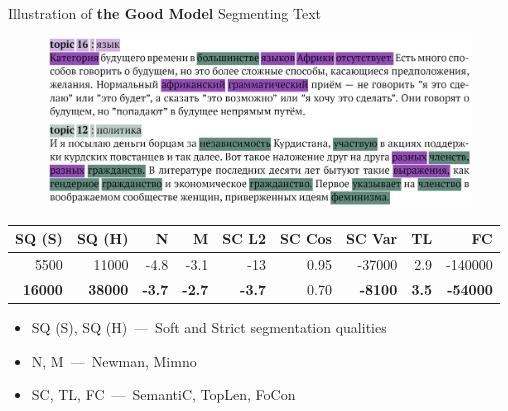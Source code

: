 \documentclass[russian]{beamer}
\begin{document}
\begin{frame}{Illustration of \textbf{the Good Model} Segmenting Text}
  \begin{figure}[h]
    \centering
    \includegraphics[width=\textwidth]{combine_good.jpg}
  \end{figure}
    
  \vspace{-0.5cm}

  \begin{table}[h]
    \scriptsize
    \centering
    \begin{tabular}{rrrrrrrrr}
      SQ (S) & SQ (H) & N & M & SC L2 & SC Cos & SC Var & TL & FC\\
      \midrule
      5500 & 11000 & -4.8 & -3.1 & -13 & 0.95 & -37000 & 2.9 & -140000\\
      \rowcolor{my-blue-light}
      \textbf{16000} & \textbf{38000} & \textbf{-3.7} & \textbf{-2.7} & \textbf{-3.7} & 0.70 & \textbf{-8100} & \textbf{3.5} & \textbf{-54000}
    \end{tabular}
  \end{table}
  
  \begin{itemize}\setlength{\itemindent}{0pt}
    \small
    \item SQ (S), SQ (H)~---~Soft and Strict segmentation qualities
    \item N, M~---~Newman, Mimno
    \item SC, TL, FC~---~SemantiC, TopLen, FoCon
  \end{itemize}
\end{frame}
\end{document}
